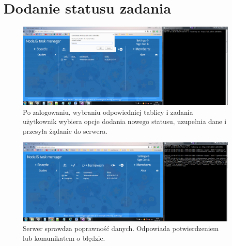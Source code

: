 \documentclass[12pt]{report}
\begin{document}
\section{Dodanie statusu zadania}
\begin{figure}[!hb]
\centering
\includegraphics[width=\textwidth,height=\textheight,keepaspectratio]{B1.png}
\captionsetup{labelformat=empty}
\caption[]{Po zalogowaniu, wybraniu odpowiedniej tablicy i zadania użytkownik wybiera opcje dodania nowego statusu, uzupełnia dane i przesyła żądanie do serwera.}
\end{figure}
\begin{figure}[!hb]
\centering
\includegraphics[width=\textwidth,height=\textheight,keepaspectratio]{B2.png}
\captionsetup{labelformat=empty}
\caption[]{Serwer sprawdza poprawność danych. Odpowiada potwierdzeniem lub komunikatem o błędzie.}
\end{figure}
\end{document}
